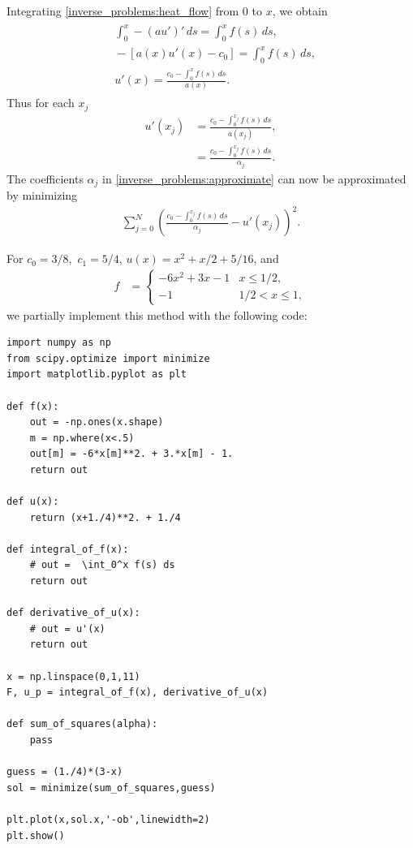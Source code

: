 Integrating \eqref{inverse_problems:heat_flow} from $0$ to $x$, we obtain
\begin{align}
\begin{split}
&{} \int_0^x -(au')'\, ds = \int_0^x f(s)\, ds,\\
&{} -[a(x)u'(x) - c_0] = \int_0^x f(s)\, ds,\\
&{} u'(x) = \frac{c_0 - \int_0^x f(s)\, ds}{a(x)}.
\end{split}
\end{align}
Thus for each $x_j$
\begin{align*}
	u'(x_j) &= \frac{c_0 - \int_0^{x_j} f(s)\, ds}{a(x_j)},\\
	&= \frac{c_0 - \int_0^{x_j} f(s)\, ds}{\alpha_j}.
\end{align*}
The coefficients $\alpha_j$ in \eqref{inverse_problems:approximate} can now be approximated by minimizing 
\begin{align*}
	\sum_{j=0}^N \left( \frac{c_0 - \int_0^{x_j} f(s)\, ds}{\alpha_j} - u'(x_j)  \right)^2.
\end{align*}

For $c_0 = 3/8,$ $c_1 = 5/4$, $u(x) = x^2 + x/2 + 5/16$, and 
\begin{align*}
	f &= \begin{cases}
		-6x^2 + 3x - 1 & x \leq 1/2,\\
		-1 & 1/2 < x \leq 1,
	\end{cases}
\end{align*}
we partially implement this method with the following code:


\begin{lstlisting}
import numpy as np
from scipy.optimize import minimize
import matplotlib.pyplot as plt

def f(x):
	out = -np.ones(x.shape)
	m = np.where(x<.5)
	out[m] = -6*x[m]**2. + 3.*x[m] - 1.
	return out

def u(x):
	return (x+1./4)**2. + 1./4

def integral_of_f(x):
	# out =  \int_0^x f(s) ds
	return out

def derivative_of_u(x):
	# out = u'(x)
	return out

x = np.linspace(0,1,11)
F, u_p = integral_of_f(x), derivative_of_u(x)

def sum_of_squares(alpha):
	pass

guess = (1./4)*(3-x)
sol = minimize(sum_of_squares,guess)

plt.plot(x,sol.x,'-ob',linewidth=2)
plt.show()
\end{lstlisting}


